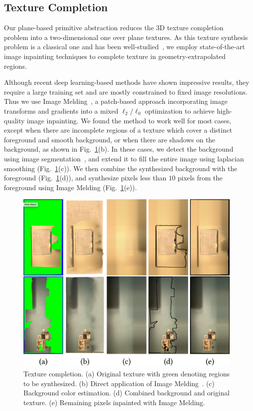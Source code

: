 \subsection{Texture Completion}
\label{subsec:3dlite-inpaint}
Our plane-based primitive abstraction reduces the 3D texture completion problem into a two-dimensional one over plane textures.
As this texture synthesis problem is a classical one and has been well-studied~\cite{criminisi2004region,simakov2008summarizing,barnes2009patchmatch,darabi2012image,wang2016unsupervised,pathak2016context,yang2016high}, we employ state-of-the-art image inpainting techniques to complete texture in geometry-extrapolated regions.

Although recent deep learning-based methods have shown impressive results, they require a large training set and are mostly constrained to fixed image resolutions. 
Thus we use Image Melding~\cite{darabi2012image}, a patch-based approach incorporating image transforms and gradients into a mixed $\ell_2/\ell_0$ optimization to achieve high-quality image inpainting.
We found the method to work well for most cases, except when there are incomplete regions of a texture which cover a distinct foreground and smooth background, or when there are shadows on the background, as shown in Fig.~\ref{fig:3dlite-synthesize}(b).
In these cases, we detect the background using image segmentation~\cite{felzenszwalb2004efficient}, and extend it to fill the entire image using laplacian smoothing (Fig.~\ref{fig:3dlite-synthesize}(c)).
We then combine the synthesized background with the foreground (Fig.~\ref{fig:3dlite-synthesize}(d)), and synthesize pixels less than $10$ pixels from the foreground using Image Melding (Fig.~\ref{fig:3dlite-synthesize}(e)).

\begin{figure}
    \centering
    \includegraphics[width=0.8\linewidth]{3dlite/fig10.png}
    \caption{Texture completion. (a) Original texture with green denoting regions to be synthesized. (b) Direct application of Image Melding~\cite{darabi2012image}. (c) Background color estimation. (d) Combined background and original texture. (e) Remaining pixels inpainted with Image Melding.}
    \label{fig:3dlite-synthesize}
\end{figure}

